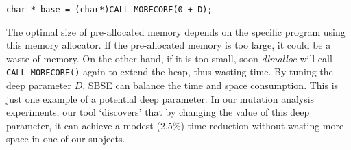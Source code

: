\begin{lstlisting}
char * base = (char*)CALL_MORECORE(0 + D);
\end{lstlisting}

The optimal size of pre-allocated memory depends on the specific program using this memory allocator. If the pre-allocated memory is too large, it could be a waste of memory. On the other hand, if it is too small, soon \emph{dlmalloc} will call {\tt CALL\_MORECORE()} again to extend the heap, thus wasting time. By tuning the deep parameter $D$, SBSE can balance the time and space consumption. This is just one example of a potential deep parameter. In our mutation analysis experiments, our tool `discovers' that by changing the value of this deep parameter, it can achieve a modest (2.5\%) time reduction without wasting more space in one of our subjects.

